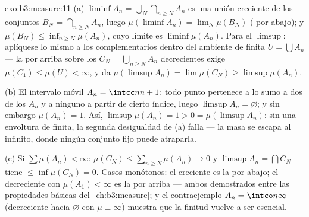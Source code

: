 \begin{solution}{exo:b3:measure:11}
(a) $\liminf A_n = \bigcup_N\bigcap_{n\geq N}A_n$ es una unión creciente
de los conjuntos $B_N = \bigcap_{n\geq N}A_n$, luego
$\mu(\liminf A_n) = \lim_N\mu(B_N)$
( por abajo); y
$\mu(B_N) \leq \inf_{n \geq N}\mu(A_n)$, cuyo límite es
$\liminf\mu(A_n)$. Para el $\limsup$: aplíquese lo mismo a los
complementarios dentro del ambiente de
 finita $U = \bigcup A_n$ --- la
 por arriba sobre los
$C_N = \bigcup_{n\geq N}A_n$ decrecientes exige $\mu(C_1)
\leq \mu(U) < \infty$, y da $\mu(\limsup A_n) =
\lim\mu(C_N) \geq \limsup\mu(A_n)$.

(b) El intervalo móvil $A_n = \intcc n{n+1}$: todo punto pertenece a lo
sumo a dos de los $A_n$ y a ninguno a partir de cierto índice, luego
$\limsup A_n = \varnothing$; y sin embargo $\mu(A_n) = 1$. Así,
$\limsup\mu(A_n) = 1 > 0 = \mu(\limsup A_n)$: sin una envoltura
de  finita, la segunda
desigualdad de (a) falla --- la masa se escapa al infinito, donde ningún
conjunto fijo puede atraparla.

(c) Si $\sum\mu(A_n) < \infty$: $\mu(C_N) \leq
\sum_{n\geq N}\mu(A_n) \to 0$ y $\limsup A_n =
\bigcap C_N$ tiene 
$\leq \inf\mu(C_N) = 0$. Casos monótonos: el creciente es la
 por abajo; el
decreciente con $\mu(A_1) < \infty$ es la
 por arriba --- ambos
demostrados entre las propiedades básicas del~\cref{ch:b3:measure}; y el
contraejemplo $A_n = \intco n\infty$ (decreciente hacia $\varnothing$
con $\mu \equiv \infty$) muestra que la finitud vuelve a ser esencial.
\end{solution}


